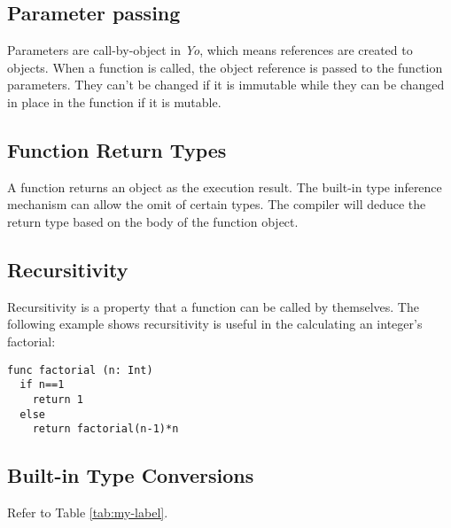 \documentclass[12pt]{article}
\begin{document}
\subsection{Parameter passing}
\label{sec:paramPassing}
Parameters are call-by-object in \textit{Yo}, which means references are created to objects. When a function is called, the object reference is passed to the function parameters. They can't be changed if it is immutable while they can be changed in place in the function if it is mutable.  

\subsection{Function Return Types}
A function returns an object as the execution result. The built-in type inference mechanism can allow the omit of certain types. The compiler will deduce the return type based on the body of the function object. 

\subsection{Recursitivity} %
Recursitivity is a property that a function can be called by themselves. The following example shows recursitivity is useful in the calculating an integer's factorial:
\begin{lstlisting}[caption=Calculate the factorial of n]
func factorial (n: Int)
  if n==1
    return 1
  else
    return factorial(n-1)*n
\end{lstlisting}

\subsection{Built-in Type Conversions} %
Refer to Table \ref{tab:my-label}.
\end{document}
